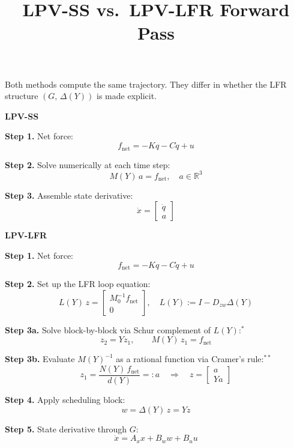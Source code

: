 \documentclass[11pt]{article}
\title{LPV-SS vs.\ LPV-LFR Forward Pass}
\author{}
\date{}
\begin{document}
\maketitle

\noindent
Both methods compute the same trajectory. They differ in whether the
LFR structure $(G,\,\Delta(Y))$ is made explicit.

\bigskip

\noindent
\begin{minipage}[t]{0.44\textwidth}
\centering\textbf{LPV-SS}

\medskip
\raggedright

\textbf{Step 1.} Net force:
\[ f_{\mathrm{net}} = -Kq - C\dot{q} + u \]

\textbf{Step 2.} Solve numerically at each time step:
\[ M(Y)\,a = f_{\mathrm{net}}, \quad a \in \mathbb{R}^3 \]

\textbf{Step 3.} Assemble state derivative:
\[ \dot{x} = \begin{bmatrix} \dot{q} \\ a \end{bmatrix} \]

\end{minipage}
\hfill
\vrule
\hfill
\begin{minipage}[t]{0.50\textwidth}
\centering\textbf{LPV-LFR}

\medskip
\raggedright

\textbf{Step 1.} Net force:
\[ f_{\mathrm{net}} = -Kq - C\dot{q} + u \]

\textbf{Step 2.} Set up the LFR loop equation:
\[ L(Y)\,z = \begin{bmatrix} M_0^{-1}f_{\mathrm{net}} \\ 0 \end{bmatrix},
   \quad L(Y) := I - D_{zw}\Delta(Y) \]

\textbf{Step 3a.} Solve block-by-block via Schur complement of $L(Y)$:$^*$
\[ z_2 = Y z_1, \qquad M(Y)\,z_1 = f_{\mathrm{net}} \]

\textbf{Step 3b.} Evaluate $M(Y)^{-1}$ as a rational function via Cramer's rule:$^{**}$
\[ z_1 = \frac{N(Y)\,f_{\mathrm{net}}}{d(Y)} =: a
   \quad\Rightarrow\quad
   z = \begin{bmatrix} a \\ Ya \end{bmatrix} \]

\textbf{Step 4.} Apply scheduling block:
\[ w = \Delta(Y)\,z = Yz \]

\textbf{Step 5.} State derivative through $G$:
\[ \dot{x} = A_x x + B_w w + B_u u \]

\end{minipage}
\end{document}
